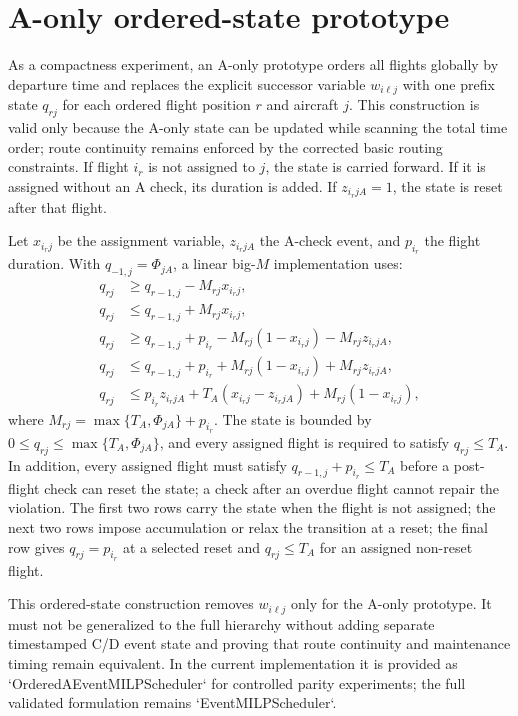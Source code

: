 \documentclass[11pt,a4paper]{article}
\begin{document}
\section{A-only ordered-state prototype}

As a compactness experiment, an A-only prototype orders all flights globally
by departure time and replaces the explicit successor variable $w_{i\ell j}$
with one prefix state $q_{rj}$ for each ordered flight position $r$ and
aircraft $j$. This construction is valid only because the A-only state can be
updated while scanning the total time order; route continuity remains enforced
by the corrected basic routing constraints. If flight $i_r$ is not assigned to
$j$, the state is carried forward. If it is assigned without an A check, its
duration is added. If $z_{i_rjA}=1$, the state is reset after that flight.

Let $x_{i_rj}$ be the assignment variable, $z_{i_rjA}$ the A-check event, and
$p_{i_r}$ the flight duration. With $q_{-1,j}=\Phi_{jA}$, a linear
big-$M$ implementation uses:
\begin{align}
q_{rj}&\ge q_{r-1,j}-M_{rj}x_{i_rj},\\
q_{rj}&\le q_{r-1,j}+M_{rj}x_{i_rj},\\
q_{rj}&\ge q_{r-1,j}+p_{i_r}-M_{rj}(1-x_{i_rj})-M_{rj}z_{i_rjA},\\
q_{rj}&\le q_{r-1,j}+p_{i_r}+M_{rj}(1-x_{i_rj})+M_{rj}z_{i_rjA},\\
q_{rj}&\le p_{i_r}z_{i_rjA}+T_A(x_{i_rj}-z_{i_rjA})
  +M_{rj}(1-x_{i_rj}),
\end{align}
where $M_{rj}=\max\{T_A,\Phi_{jA}\}+p_{i_r}$. The state is bounded by
$0\le q_{rj}\le\max\{T_A,\Phi_{jA}\}$, and every assigned flight is
required to satisfy $q_{rj}\le T_A$. In addition, every assigned flight must satisfy
$q_{r-1,j}+p_{i_r}\le T_A$ before a post-flight check can reset the state; a
check after an overdue flight cannot repair the violation. The first two rows carry the state when
the flight is not assigned; the next two rows impose accumulation or relax
the transition at a reset; the final row gives $q_{rj}=p_{i_r}$ at a selected
reset and $q_{rj}\le T_A$ for an assigned non-reset flight.

This ordered-state construction removes $w_{i\ell j}$ only for the A-only
prototype. It must not be generalized to the full hierarchy without adding
separate timestamped C/D event state and proving that route continuity and
maintenance timing remain equivalent. In the current implementation it is
provided as `OrderedAEventMILPScheduler` for controlled parity experiments;
the full validated formulation remains `EventMILPScheduler`.
\end{document}
